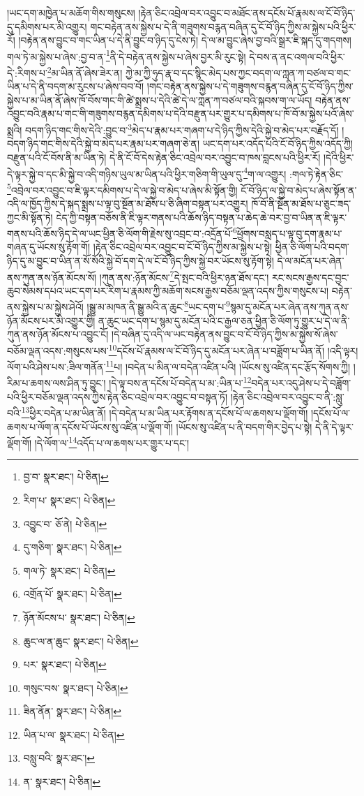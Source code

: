 །ཡང་དག་མཁྱེན་པ་མཆོག་གིས་གསུངས། །རྟེན་ཅིང་འབྲེལ་བར་འབྱུང་བ་མཐོང་ནས་དངོས་པོ་རྣམས་ལ་ངོ་བོ་ཉིད་དུ་དམིགས་པར་མི་འགྱུར། གང་བརྟེན་ནས་སྐྱེས་པ་དེ་ནི་གཟུགས་བརྙན་བཞིན་དུ་ངོ་བོ་ཉིད་ཀྱིས་མ་སྐྱེས་པའི་ཕྱིར་རོ། །བརྟེན་ནས་བྱུང་བ་གང་ཡིན་པ་དེ་ནི་བྱུང་བ་ཉིད་དུ་ངེས་ཏེ། དེ་ལ་མ་བྱུང་ཞེས་བྱ་བའི་སྒྲར་ཇི་སྐད་དུ་གདགས། གལ་ཏེ་མ་སྐྱེས་པ་ཞེས་:བྱ་བ་ན་\footnote{བྱ་བ་  སྣར་ཐང་།  པེ་ཅིན། }ནི་དེ་བརྟེན་ནས་སྐྱེས་པ་ཞེས་བྱར་མི་རུང་སྟེ། དེ་བས་ན་ནང་འགལ་བའི་ཕྱིར་དེ་:རིགས་པ་\footnote{རིག་པ་  སྣར་ཐང་།  པེ་ཅིན། }མ་ཡིན་ནོ་ཞེས་ཟེར་ན། ཀྱེ་མ་ཀྱི་ཧུད་རྣ་བ་དང་སྙིང་མེད་པས་ཀྱང་བདག་ལ་ཀླན་ཀ་བཙལ་བ་གང་ཡིན་པ་དེ་ནི་བདག་མ་རུངས་པ་ཞེས་བབ་བོ། །གང་བརྟེན་ནས་སྐྱེས་པ་དེ་གཟུགས་བརྙན་བཞིན་དུ་ངོ་བོ་ཉིད་ཀྱིས་སྐྱེས་པ་མ་ཡིན་ནོ་ཞེས་ཁོ་བོས་གང་གི་ཚེ་སྨྲས་པ་དེའི་ཚེ་དེ་ལ་ཀླན་ཀ་བཙལ་བའི་སྐབས་ག་ལ་ཡོད། བརྟེན་ནས་འབྱུང་བའི་རྣམ་པ་གང་གི་གཟུགས་བརྙན་དམིགས་པ་དེའི་བརྫུན་པར་གྱུར་པ་དམིགས་པ་ཁོ་བོ་མ་སྐྱེས་པའོ་ཞེས་སྨྲའི། བདག་ཉིད་གང་གིས་དེའི་:བྱུང་བ་\footnote{འབྱུང་བ་  ཅོ་ནེ།  པེ་ཅིན། }མེད་པ་རྣམ་པར་གཞག་པ་དེ་ཉིད་ཀྱིས་དེའི་སྐྱེ་བ་མེད་པར་བརྗོད་དོ། །བདག་ཉིད་གང་གིས་དེའི་སྐྱེ་བ་མེད་པར་རྣམ་པར་གཞག་ཅེ་ན། ཡང་དག་པར་འདོད་པའི་ངོ་བོ་ཉིད་ཀྱིས་འདོད་ཀྱི། བརྫུན་པའི་ངོ་བོས་ནི་མ་ཡིན་ཏེ། དེ་ནི་ངོ་བོ་དེས་རྟེན་ཅིང་འབྲེལ་བར་འབྱུང་བ་ཁས་བླངས་པའི་ཕྱིར་རོ། །དེའི་ཕྱིར་དེ་ལྟར་སྐྱེ་བ་དང་མི་སྐྱེ་བ་འདི་གཉིས་ཡུལ་མ་ཡིན་པའི་ཕྱིར་གཅིག་གི་ཡུལ་དུ་\footnote{དུ་གཅིག་  སྣར་ཐང་།  པེ་ཅིན། }ག་ལ་འགྱུར། :གལ་ཏེ་རྟེན་ཅིང་\footnote{གལ་ཏེ་  སྣར་ཐང་།  པེ་ཅིན། }འབྲེལ་བར་འབྱུང་བ་ཇི་ལྟར་དམིགས་པ་དེ་ལ་སྐྱེ་བ་མེད་པ་ཞེས་མི་སྟོན་གྱི། ངོ་བོ་ཉིད་ལ་སྐྱེ་བ་མེད་པ་ཞེས་སྟོན་ན་འདི་ལ་ཁྱོད་ཀྱིས་དེ་སྐད་སྨྲས་པ་ལྟ་བུ་སྔོན་མ་ཐོས་པ་ཅི་ཞིག་བསྟན་པར་འགྱུར། ཁོ་བོ་ནི་སྔོན་མ་ཐོས་པ་ཅུང་ཟད་ཀྱང་མི་སྟོན་ཏེ། ངེད་ཀྱི་བསྟན་བཅོས་ནི་ཇི་ལྟར་གནས་པའི་ཆོས་ཉིད་བསྟན་པ་ཆེད་ཆེ་བར་བྱ་བ་ཡིན་ན་ཇི་ལྟར་གནས་པའི་ཆོས་ཉིད་དེ་ལ་ཡང་ཕྱིན་ཅི་ལོག་གི་རྗེས་སུ་འབྲང་བ་:འདྲོན་པོ་\footnote{འགྲོན་པོ་  སྣར་ཐང་།  པེ་ཅིན། }ཕྱོགས་བསླད་པ་ལྟ་བུ་དག་རྣམ་པ་གཞན་དུ་ཡོངས་སུ་རྟོག་གོ། །རྟེན་ཅིང་འབྲེལ་བར་འབྱུང་བ་ངོ་བོ་ཉིད་ཀྱིས་མ་སྐྱེས་པ་སྟེ། ཕྱིན་ཅི་ལོག་པའི་བདག་ཉིད་དུ་མ་བྱུང་བ་ཡིན་ན་སོ་སོའི་སྐྱེ་བོ་དག་དེ་ལ་ངོ་བོ་ཉིད་ཀྱིས་སྐྱེ་བར་ཡོངས་སུ་རྟོག་སྟེ། དེ་ལ་མངོན་པར་ཞེན་ནས་ཀུན་ནས་ཉོན་མོངས་སོ། །ཀུན་ནས་:ཉོན་མོངས་\footnote{ཉོན་མོངས་པ་  སྣར་ཐང་།  པེ་ཅིན། }དེ་སྤང་བའི་ཕྱིར་ཉན་ཐོས་དང་། རང་སངས་རྒྱས་དང་བྱང་ཆུབ་སེམས་དཔའ་ཡང་དག་པར་རིག་པ་རྣམས་ཀྱི་མཆོག་སངས་རྒྱས་བཅོམ་ལྡན་འདས་ཀྱིས་གསུངས་པ། བརྟེན་ནས་སྐྱེས་པ་མ་སྐྱེས་ཤེའོ། །སྒྱུ་མ་མཁན་ནི་སྒྱུ་མའི་ན་ཆུང་\footnote{ཆུང་ལ་ན་ཆུང་  སྣར་ཐང་།  པེ་ཅིན། }ཡང་དག་པ་\footnote{པར་  སྣར་ཐང་།  པེ་ཅིན། }སྙམ་དུ་མངོན་པར་ཞེན་ནས་ཀུན་ནས་ཉོན་མོངས་པར་མི་འགྱུར་གྱི། ན་ཆུང་ཡང་དག་པ་སྙམ་དུ་མངོན་པའི་ང་རྒྱལ་ཅན་ཕྱིན་ཅི་ལོག་ཏུ་གྱུར་པ་དེ་ལ་ནི་ཀུན་ནས་ཉོན་མོངས་པ་འབྱུང་ངོ། །དེ་བཞིན་དུ་འདི་ལ་ཡང་བརྟེན་ནས་བྱུང་བ་ངོ་བོ་ཉིད་ཀྱིས་མ་སྐྱེས་སོ་ཞེས་བཅོམ་ལྡན་འདས་:གསུངས་པས་\footnote{གསུང་བས་  སྣར་ཐང་།  པེ་ཅིན། }དངོས་པོ་རྣམས་ལ་ངོ་བོ་ཉིད་དུ་མངོན་པར་ཞེན་པ་བཟློག་པ་ཡིན་ནོ། །འདི་ལྟར། ལོག་པའི་ཤེས་པས་:ཟིལ་གནོན་\footnote{ཟིན་ནོན་  སྣར་ཐང་།  པེ་ཅིན། }པ། །བདེན་པ་མིན་ལ་བདེན་འཛིན་པའི། །ཡོངས་སུ་འཛིན་དང་རྩོད་སོགས་ཀྱི། །རིམ་པ་ཆགས་ལས་ཤིན་ཏུ་བྱུང་། །དེ་ལྟ་བས་ན་དངོས་པོ་བདེན་པ་མ་:ཡིན་པ་\footnote{ཡིན་པ་ལ་  སྣར་ཐང་།  པེ་ཅིན། }བདེན་པར་འདུ་ཤེས་པ་དེ་བཟློག་པའི་ཕྱིར་བཅོམ་ལྡན་འདས་ཀྱིས་རྟེན་ཅིང་འབྲེལ་བར་འབྱུང་བ་བསྟན་ཏོ། །རྟེན་ཅིང་འབྲེལ་བར་འབྱུང་བ་ནི་:སླུ་བའི་\footnote{བསླུ་བའི་  སྣར་ཐང་། }ཕྱིར་བདེན་པ་མ་ཡིན་ནོ། །དེ་བདེན་པ་མ་ཡིན་པར་རྟོགས་ན་དངོས་པོ་ལ་ཆགས་པ་ལྡོག་གོ། །དངོས་པོ་ལ་ཆགས་པ་ལོག་ན་དངོས་པོ་ཡོངས་སུ་འཛིན་པ་ལྡོག་གོ། །ཡོངས་སུ་འཛིན་པ་ནི་བདག་གིར་བྱེད་པ་སྟེ། དེ་ནི་དེ་ལྟར་ལྡོག་གོ། །དེ་ལོག་ལ་\footnote{ན་  སྣར་ཐང་།  པེ་ཅིན། }འདོད་པ་ལ་ཆགས་པར་གྱུར་པ་དང་། 